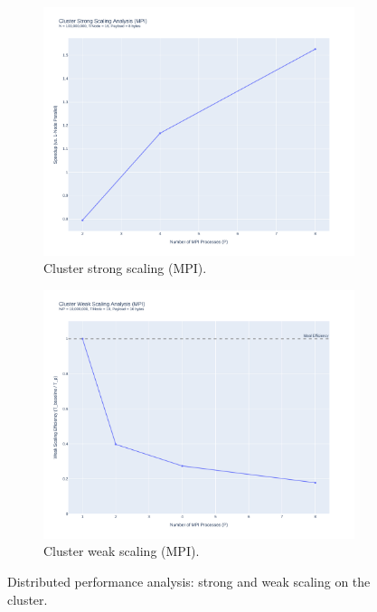 \documentclass[10pt]{article}
\begin{document}
\begin{figure}[H]
    \centering
    \begin{subfigure}{0.49\textwidth}
        \includegraphics[width=\linewidth]{../python/plots/cluster_scaling.pdf}
        \caption{Cluster strong scaling (MPI).}
        \label{fig:cluster_strong_scaling}
    \end{subfigure}
    \hfill
    \begin{subfigure}{0.49\textwidth}
        \includegraphics[width=\linewidth]{../python/plots/cluster_weak_scaling.pdf}
        \caption{Cluster weak scaling (MPI).}
        \label{fig:cluster_weak_scaling}
    \end{subfigure}
    \caption{Distributed performance analysis: strong and weak scaling on the cluster.}
    \label{fig:cluster_analysis}
\end{figure}
\end{document}
